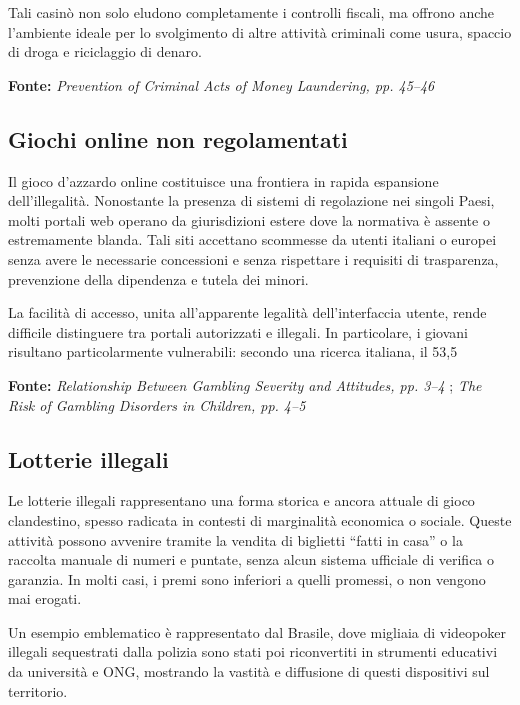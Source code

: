 \documentclass[a4paper,12pt]{article}
\begin{document}
Tali casinò non solo eludono completamente i controlli fiscali, ma offrono anche l’ambiente ideale per lo svolgimento di altre attività criminali come usura, spaccio di droga e riciclaggio di denaro.

\textbf{Fonte:} \textit{Prevention of Criminal Acts of Money Laundering, pp. 45--46} \cite{tarina2019moneylaundering}

\subsection{Giochi online non regolamentati}

Il gioco d’azzardo online costituisce una frontiera in rapida espansione dell’illegalità. Nonostante la presenza di sistemi di regolazione nei singoli Paesi, molti portali web operano da giurisdizioni estere dove la normativa è assente o estremamente blanda. Tali siti accettano scommesse da utenti italiani o europei senza avere le necessarie concessioni e senza rispettare i requisiti di trasparenza, prevenzione della dipendenza e tutela dei minori.

La facilità di accesso, unita all’apparente legalità dell’interfaccia utente, rende difficile distinguere tra portali autorizzati e illegali. In particolare, i giovani risultano particolarmente vulnerabili: secondo una ricerca italiana, il 53,5%

\textbf{Fonte:} \textit{Relationship Between Gambling Severity and Attitudes, pp. 3--4} \cite{gori2014adolescentgambling}; \textit{The Risk of Gambling Disorders in Children, pp. 4--5} \cite{ferrara2019childrenrisk}

\subsection{Lotterie illegali}

Le lotterie illegali rappresentano una forma storica e ancora attuale di gioco clandestino, spesso radicata in contesti di marginalità economica o sociale. Queste attività possono avvenire tramite la vendita di biglietti “fatti in casa” o la raccolta manuale di numeri e puntate, senza alcun sistema ufficiale di verifica o garanzia. In molti casi, i premi sono inferiori a quelli promessi, o non vengono mai erogati.

Un esempio emblematico è rappresentato dal Brasile, dove migliaia di videopoker illegali sequestrati dalla polizia sono stati poi riconvertiti in strumenti educativi da università e ONG, mostrando la vastità e diffusione di questi dispositivi sul territorio.
\end{document}
